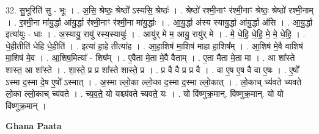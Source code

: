\documentclass[17pt]{extarticle}
\begin{document}
32. सु॒भूरिति॑ सु - भूः । . अ॒सि॒ श्रेष्ठः॒ श्रेष्ठो᳚ ऽस्यसि॒ श्रेष्ठः॑ । . श्रेष्ठो॑ रश्मी॒नाꣳ र॑श्मी॒नाꣳ श्रेष्ठः॒ श्रेष्ठो॑ रश्मी॒नाम् । . र॒श्मी॒ना मा॑यु॒र्द्धा आ॑यु॒र्द्धा र॑श्मी॒नाꣳ र॑श्मी॒ना मा॑यु॒र्द्धाः । . आ॒यु॒र्द्धा अ॑स्य स्यायु॒र्द्धा आ॑यु॒र्द्धा अ॑सि । . आ॒यु॒र्द्धा इत्या॑युः - धाः । . अ॒स्यायु॒ रायु॑ रस्य॒स्यायुः॑ । . आयु॑र् मे म॒ आयु॒ रायु॑र् मे । . मे॒ धे॒हि॒ धे॒हि॒ मे॒ मे॒ धे॒हि॒ । . धे॒हीतीति॑ धेहि धे॒हीति॑ । . इत्या॑ हा॒हे तीत्या॑ह । . आ॒हा॒शिष॑ मा॒शिष॑ माहा हा॒शिष᳚म् । . आ॒शिष॑ मे॒वै वाशिष॑ मा॒शिष॑ मे॒व । . आ॒शिष॒मित्या᳚ - शिष᳚म् । . ए॒वैता मे॒ता मे॒वै वैताम् । . ए॒ता मैता मे॒ता मा । . आ शा᳚स्ते शास्त॒ आ शा᳚स्ते । . शा॒स्ते॒ प्र प्र शा᳚स्ते शास्ते॒ प्र । . प्र वै वै प्र प्र वै । . वा ए॒ष ए॒ष वै वा ए॒षः । . ए॒षो᳚ ऽस्मा द॒स्मा दे॒ष ए॒षो᳚ ऽस्मात् । . अ॒स्मा ल्लो॒का ल्लो॒का द॒स्मा द॒स्मा ल्लो॒कात् । . लो॒काच् च्य॑वते च्यवते लो॒का ल्लो॒काच् च्य॑वते । . च्य॒व॒ते॒ यो यश्च्य॑वते च्यवते॒ यः । . यो वि॑ष्णुक्र॒मान्. वि॑ष्णुक्र॒मान्. यो यो वि॑ष्णुक्र॒मान् । \newline

\textbf{Ghana Paata } \newline
\end{document}

